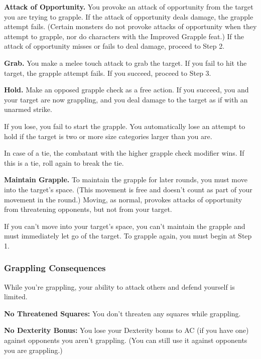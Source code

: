 \begin{enumerate*}
\item \textbf{Attack of Opportunity.} You provoke an attack of opportunity from the target you are trying to grapple. If the attack of opportunity deals damage, the grapple attempt fails. (Certain monsters do not provoke attacks of opportunity when they attempt to grapple, nor do characters with the Improved Grapple feat.) If the attack of opportunity misses or fails to deal damage, proceed to Step 2.

\item \textbf{Grab.} You make a melee touch attack to grab the target. If you fail to hit the target, the grapple attempt fails. If you succeed, proceed to Step 3.

\item \textbf{Hold.} Make an opposed grapple check as a free action. If you succeed, you and your target are now grappling, and you deal damage to the target as if with an unarmed strike.

If you lose, you fail to start the grapple. You automatically lose an attempt to hold if the target is two or more size categories larger than you are.

In case of a tie, the combatant with the higher grapple check modifier wins. If this is a tie, roll again to break the tie.

\item \textbf{Maintain Grapple.} To maintain the grapple for later rounds, you must move into the target's space. (This movement is free and doesn't count as part of your movement in the round.) Moving, as normal, provokes attacks of opportunity from threatening opponents, but not from your target.

If you can't move into your target's space, you can't maintain the grapple and must immediately let go of the target. To grapple again, you must begin at Step 1.
\end{enumerate*}

\subsubsection{Grappling Consequences}
While you're grappling, your ability to attack others and defend yourself is limited.

\textbf{No Threatened Squares:} You don't threaten any squares while grappling.

\textbf{No Dexterity Bonus:} You lose your Dexterity bonus to AC (if you have one) against opponents you aren't grappling. (You can still use it against opponents you are grappling.)

